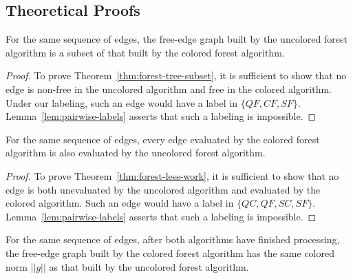 \subsection{Theoretical Proofs}

\begin{theorem}
For the same sequence of edges,
the free-edge graph built by the
uncolored forest algorithm
is a subset of that built by the
colored forest algorithm.
\label{thm:forest-tree-subset}
\end{theorem}

\begin{proof}
To prove Theorem~\ref{thm:forest-tree-subset},
it is sufficient to show that no edge is non-free in the uncolored algorithm
and free in the colored algorithm.
Under our labeling, such an edge would have a label in
$\{ QF, CF, SF \}$.
Lemma~\ref{lem:pairwise-labels} asserts that
such a labeling is impossible.
\end{proof}

\begin{theorem}
For the same sequence of edges,
every edge evaluated by the
colored forest algorithm
is also evaluated by the
uncolored forest algorithm.
\label{thm:forest-less-work}
\end{theorem}

\begin{proof}
To prove Theorem~\ref{thm:forest-less-work},
it is sufficient to show that no edge is both
unevaluated by the uncolored algorithm
and evaluated by the colored algorithm.
Such an edge would have a label in
$\{ QC, QF, SC, SF \}$.
Lemma~\ref{lem:pairwise-labels} asserts that
such a labeling is impossible.
\end{proof}

\begin{theorem}
For the same sequence of edges,
after both algorithms have finished processing,
the free-edge graph built by the
colored forest algorithm
has the same colored norm $||g||$
as that built by the
uncolored forest algorithm.
\label{thm:forest-same-score}
\end{theorem}

